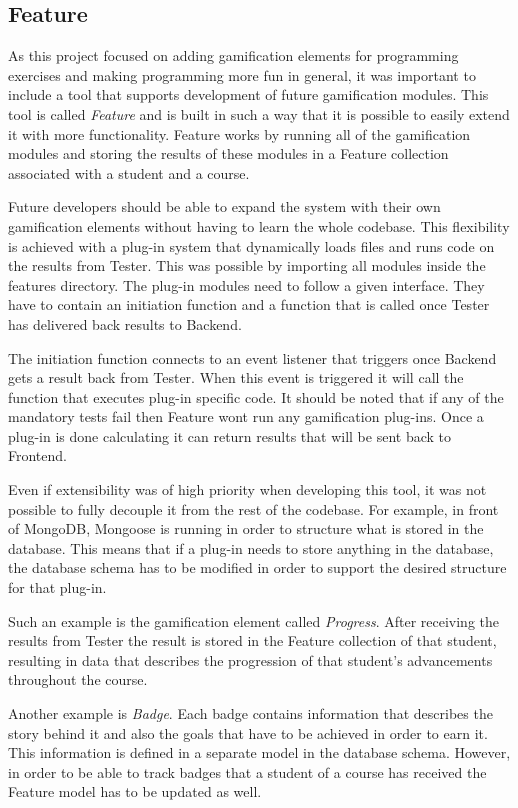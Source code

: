 \subsection{Feature}
As this project focused on adding gamification elements for programming exercises and making programming more fun in general, it was important to include a tool that supports development of future gamification modules. This tool is called \emph{Feature} and is built in such a way that it is possible to easily extend it with more functionality. Feature works by running all of the gamification modules and storing the results of these modules in a Feature collection associated with a student and a course.

Future developers should be able to expand the system with their own gamification elements without having to learn the whole codebase. This flexibility is achieved with a plug-in system that dynamically loads files and runs code on the results from Tester. This was possible by importing all modules inside the features directory. The plug-in modules need to follow a given interface. They have to contain an initiation function and a function that is called once Tester has delivered back results to Backend. 

The initiation function connects to an event listener that triggers once Backend
gets a result back from Tester. When this event is triggered it will call the
function that executes plug-in specific code. It should be noted that if any of the mandatory tests fail then Feature wont run any gamification plug-ins. Once a plug-in is done calculating it can return results that will be sent back to Frontend.

Even if extensibility was of high priority when developing this tool, it was not
possible to fully decouple it from the rest of the codebase. For example, in front of MongoDB, Mongoose is running in order to structure what is stored in the database. This means that if a plug-in needs to store anything in the database, the database schema has to be modified in order to support the desired structure for that plug-in.

Such an example is the gamification element called \emph{Progress}. After
receiving the results from Tester the result is stored in the Feature collection
of that student, resulting in data that describes the progression of that student's advancements throughout the course.

Another example is \emph{Badge}. Each badge contains information that describes the story behind it and also the goals that have to be achieved in order to earn it. This information is defined in a separate model in the database schema. However, in order to be able to track badges that a student of a course has received the Feature model has to be updated as well.

